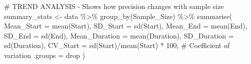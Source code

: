 \documentclass[
]{agujournal2019}
\newenvironment{Shaded}{\begin{snugshade}}{\end{snugshade}}
\newcommand{\AttributeTok}[1]{\textcolor[rgb]{0.40,0.45,0.13}{#1}}
\newcommand{\CommentTok}[1]{\textcolor[rgb]{0.37,0.37,0.37}{#1}}
\newcommand{\DecValTok}[1]{\textcolor[rgb]{0.68,0.00,0.00}{#1}}
\newcommand{\FunctionTok}[1]{\textcolor[rgb]{0.28,0.35,0.67}{#1}}
\newcommand{\NormalTok}[1]{\textcolor[rgb]{0.00,0.23,0.31}{#1}}
\newcommand{\OtherTok}[1]{\textcolor[rgb]{0.00,0.23,0.31}{#1}}
\newcommand{\SpecialCharTok}[1]{\textcolor[rgb]{0.37,0.37,0.37}{#1}}
\newcommand{\StringTok}[1]{\textcolor[rgb]{0.13,0.47,0.30}{#1}}
\begin{document}
\begin{Shaded}
\begin{Highlighting}[]
\CommentTok{\# TREND ANALYSIS {-} Shows how precision changes with sample size}
\NormalTok{summary\_stats }\OtherTok{\textless{}{-}}\NormalTok{ data }\SpecialCharTok{\%\textgreater{}\%}
  \FunctionTok{group\_by}\NormalTok{(Sample\_Size) }\SpecialCharTok{\%\textgreater{}\%}
  \FunctionTok{summarise}\NormalTok{(}
    \AttributeTok{Mean\_Start =} \FunctionTok{mean}\NormalTok{(Start),}
    \AttributeTok{SD\_Start =} \FunctionTok{sd}\NormalTok{(Start),}
    \AttributeTok{Mean\_End =} \FunctionTok{mean}\NormalTok{(End),}
    \AttributeTok{SD\_End =} \FunctionTok{sd}\NormalTok{(End),}
    \AttributeTok{Mean\_Duration =} \FunctionTok{mean}\NormalTok{(Duration),}
    \AttributeTok{SD\_Duration =} \FunctionTok{sd}\NormalTok{(Duration),}
    \AttributeTok{CV\_Start =} \FunctionTok{sd}\NormalTok{(Start)}\SpecialCharTok{/}\FunctionTok{mean}\NormalTok{(Start) }\SpecialCharTok{*} \DecValTok{100}\NormalTok{,  }\CommentTok{\# Coefficient of variation}
    \AttributeTok{.groups =} \StringTok{\textquotesingle{}drop\textquotesingle{}}
\NormalTok{  )}


\end{Highlighting}
\end{Shaded}
\end{document}
